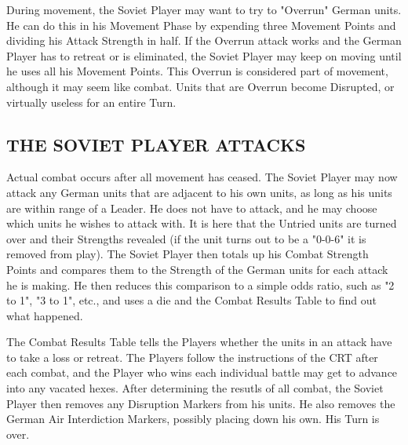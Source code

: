 During movement, the Soviet Player may want to try to "Overrun" German units. He can do this in his Movement Phase by expending three Movement Points and dividing his Attack Strength in half. If the Overrun attack works and the German Player has to retreat or is eliminated, the Soviet Player may keep on moving until he uses all his Movement Points. This Overrun is considered part of movement, although it may seem like combat. Units that are Overrun become Disrupted, or virtually useless for an entire Turn.

\subsection{THE SOVIET PLAYER ATTACKS}

Actual combat occurs after all movement has ceased. The Soviet Player may now attack any German units that are adjacent to his own units, as long as his units are within range of a Leader. He does not have to attack, and he may choose which units he wishes to attack with. It is here that the Untried units are turned over and their Strengths revealed (if the unit turns out to be a "0-0-6" it is removed from play). The Soviet Player then totals up his Combat Strength Points and compares them to the Strength of the German units for each attack he is making. He then reduces this comparison to a simple odds ratio, such as "2 to 1", "3 to 1", etc., and uses a die and the Combat Results Table to find out what happened.

The Combat Results Table tells the Players whether the units in an attack have to take a loss or retreat. The Players follow the instructions of the CRT after each combat, and the Player who wins each individual battle may get to advance into any vacated hexes. After determining the resutls of all combat, the Soviet Player then removes any Disruption Markers from his units. He also removes the German Air Interdiction Markers, possibly placing down his own. His Turn is over.